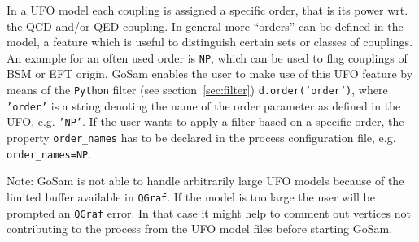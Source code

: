 \documentclass[11pt,a4paper]{refrep}
\newcommand{\gosam}{{\sc GoSam}\xspace}
\newcommand{\qgraf}{{\tt QGraf}\xspace}
\newcommand{\python}{{\tt Python}\xspace}
\begin{document}
In a UFO model each coupling is assigned a specific order, that is its power wrt. the QCD and/or QED coupling. In general more ``orders'' can be defined in the model, a feature which is useful to distinguish certain sets or classes of couplings. An example for an often used order is \texttt{NP}, which can be used to flag couplings of BSM or EFT origin. \gosam enables the user to make use of this UFO feature by means of the \python filter (see section~\ref{sec:filter}) \texttt{d.order('order')}, where \texttt{'order'} is a string denoting the name of the order parameter as defined in the UFO, e.g. \texttt{'NP'}. If the user wants to apply a filter based on a specific order, the property \texttt{order\_names} has to be declared in the process configuration file, e.g. \texttt{order\_names=NP}.

Note: \gosam is not able to handle arbitrarily large UFO models because of the limited buffer available in \qgraf. If the model is too large the user will be prompted an \qgraf error. In that case it might help to comment out vertices not contributing to the process from the UFO model files before starting \gosam.
\end{document}
